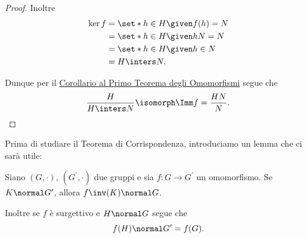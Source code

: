 \begin{proof}
    Inoltre \begin{align*}
        \ker f &= \set*{h \in H \given f(h) = N} \\
        &= \set*{h \in H \given hN = N} \\
        &= \set*{h \in H \given h \in N} \\
        &= H \inters N.
    \end{align*}

    Dunque per il \hyperref[cor:G/ker=Imm]{Corollario al Primo Teorema degli Omomorfismi} segue che \[
        \frac{H}{H \inters N} \isomorph \Imm f = \frac{HN}{N}. \qedhere    
    \]
\end{proof}

Prima di studiare il Teorema di Corrispondenza, introduciamo un lemma che ci sarà utile:
\begin{lemma}\label{lem:controimm_normal}
    Siano $(G, \cdot)$, $(G^\prime, \cdot)$ due gruppi e sia $f : G \to G^\prime$ un omomorfismo. Se $K \normal G^\prime$, allora $f\inv(K) \normal G$.

    Inoltre se $f$ è surgettivo e $H \normal G$ segue che \[
        f(H) \normal G^\prime = f(G).    
    \]
\end{lemma}

